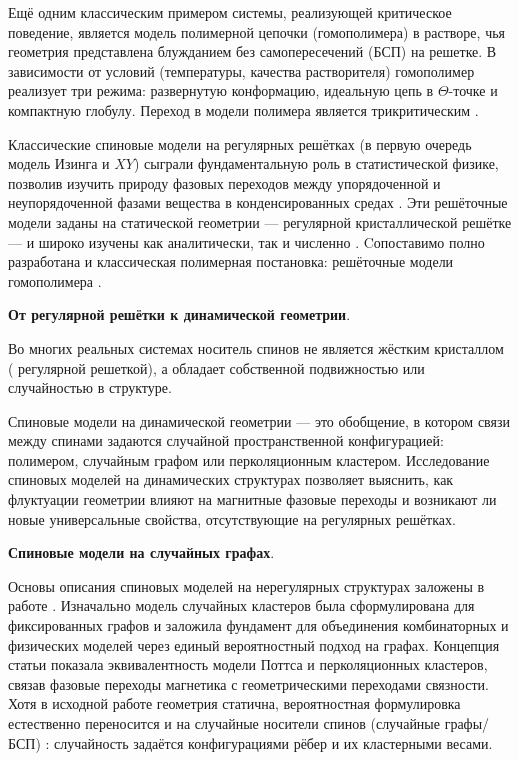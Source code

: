 Ещё одним классическим примером системы, реализующей критическое поведение, является модель полимерной цепочки (гомополимера) в растворе, чья геометрия представлена блужданием без самопересечений (БСП) на решетке. 
В зависимости от условий (температуры, качества растворителя) гомополимер реализует три режима: развернутую конформацию, идеальную цепь в  $\Theta$-точке и компактную глобулу. 
Переход в модели полимера является трикритическим \cite{Scaling_concepts}. 

Классические спиновые модели на регулярных решётках (в первую очередь модель Изинга и $XY$) сыграли фундаментальную роль в статистической физике, позволив изучить природу фазовых переходов между упорядоченной и неупорядоченной фазами вещества в конденсированных средах \cite{Kardar_2007, Cardy_1996}. 
Эти решёточные модели заданы на статической геометрии --- регулярной кристаллической решётке --- и широко изучены как аналитически, так и численно \cite{baxter2013exactly,PELISSETTO2002549}.
Cопоставимо полно разработана и классическая полимерная постановка: решёточные модели гомополимера \cite{Rensburg, Vanderzande_1998}.


\textbf{От регулярной решётки к динамической геометрии}. 

Во многих реальных системах носитель спинов не является жёстким кристаллом (   регулярной решеткой), а обладает собственной подвижностью или случайностью в структуре.

Спиновые модели на динамической геометрии --- это обобщение, в котором связи между спинами задаются случайной пространственной конфигурацией: полимером, случайным графом или перколяционным кластером. 
Исследование спиновых моделей на динамических структурах позволяет выяснить, как флуктуации геометрии влияют на магнитные фазовые переходы и возникают ли новые универсальные свойства, отсутствующие на регулярных решётках.

 
 

\textbf{Спиновые модели на случайных графах}. 

Основы описания спиновых моделей на нерегулярных структурах заложены в работе \cite{FORTUIN1972536}. 
Изначально модель случайных кластеров  была сформулирована для фиксированных  графов и  заложила фундамент для  объединения комбинаторных и физических моделей через единый вероятностный подход на графах. 
Концепция статьи показала эквивалентность модели Поттса и перколяционных кластеров, связав фазовые переходы магнетика с геометрическими переходами связности. 
Хотя в исходной работе геометрия статична, вероятностная формулировка естественно переносится и на случайные носители спинов (случайные графы/БСП) : случайность задаётся конфигурациями рёбер и их кластерными весами. 


